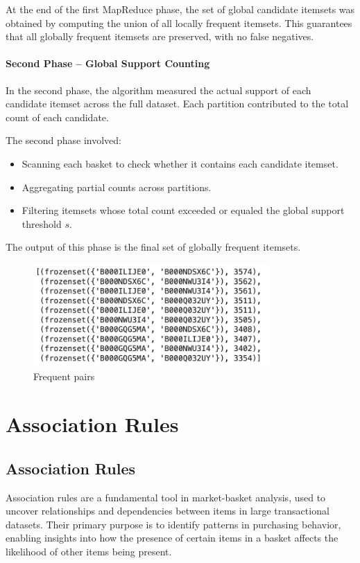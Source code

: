 \documentclass[a4paper,12pt]{article}
\begin{document}
At the end of the first MapReduce phase, the set of global candidate itemsets was obtained by computing the union of all locally frequent itemsets. This guarantees that all globally frequent itemsets are preserved, with no false negatives.

\paragraph{Second Phase – Global Support Counting}

In the second phase, the algorithm measured the actual support of each candidate itemset across the full dataset. Each partition contributed to the total count of each candidate.

The second phase involved:
\begin{itemize}
    \item Scanning each basket to check whether it contains each candidate itemset.
    \item Aggregating partial counts across partitions.
    \item Filtering itemsets whose total count exceeded or equaled the global support threshold $s$.
\end{itemize}

The output of this phase is the final set of globally frequent itemsets.

\begin{figure}[h]
    \centering
    \includegraphics[width=9cm]{images/SON.png}
    \caption{Frequent pairs}
\end{figure}

\newpage
\section{Association Rules}

\subsection*{Association Rules}

Association rules are a fundamental tool in market-basket analysis, used to uncover relationships and dependencies between items in large transactional datasets. Their primary purpose is to identify patterns in purchasing behavior, enabling insights into how the presence of certain items in a basket affects the likelihood of other items being present.
\end{document}
